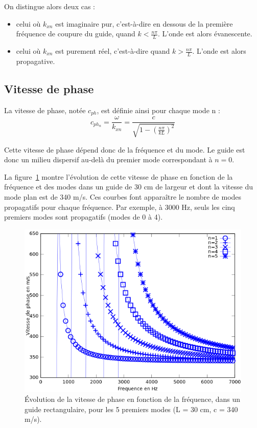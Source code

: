 \documentclass[a4paper,11pt]{report} %
\begin{document}
On distingue alors deux cas : 

\begin{itemize}
\item celui où $k_{xn}$ est imaginaire pur, c'est-à-dire en dessous de la première fréquence de coupure du guide, quand $k<\frac{n\pi}{L}$. L'onde est alors évanescente.
\item celui où $k_{xn}$ est purement réel, c'est-à-dire quand $k>\frac{n\pi}{L}$. L'onde est alors propagative.
\end{itemize}

\subsection{Vitesse de phase}	
La vitesse de phase, notée $c_{ph}$, est définie ainsi pour chaque mode n : 
\begin{equation*}
c_{ph_n} = \frac{\omega}{k_{xn}} = \frac{c}{\sqrt{1-\left(\frac{n\pi}{kL}\right)^2}}
\end{equation*}

Cette vitesse de phase dépend donc de la fréquence et du mode. Le guide est donc un milieu dispersif au-delà du premier mode correspondant à $n=0$.

La figure~\ref{graph_c_phase} montre l'évolution de cette vitesse de phase en fonction de la fréquence et des modes dans un guide de 30 cm de largeur et dont la vitesse du mode plan est de 340 m/s. 
Ces courbes font apparaître le nombre de modes propagatifs pour chaque fréquence. Par exemple, à 3000 Hz, seuls les cinq premiers modes sont propagatifs (modes de 0 à 4).

\begin{figure}[h!]
\centering \includegraphics[scale = 0.6]{./figures/c_phase.jpg}
\caption{Évolution de la vitesse de phase en fonction de la fréquence, dans un guide rectangulaire, pour les 5 premiers modes (L = 30 cm, c = 340 m/s).} \label{graph_c_phase}
\end{figure}
\end{document}
